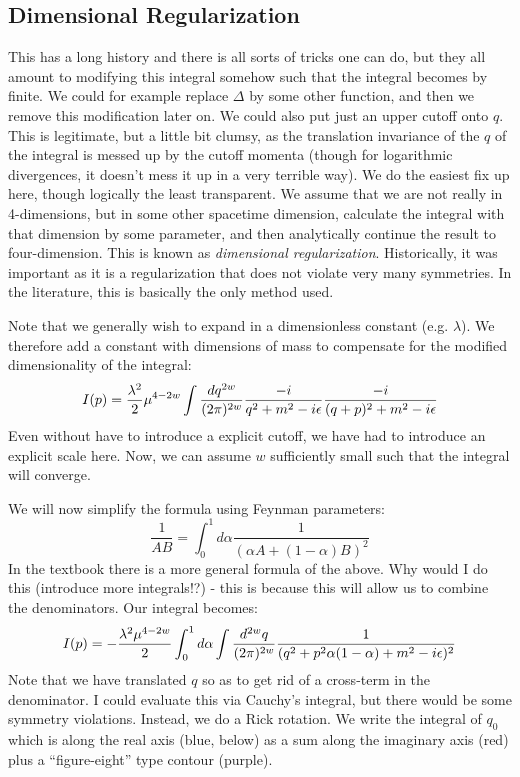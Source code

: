 \subsection{Dimensional Regularization}
This has a long history and there is all sorts of tricks one can do, but they all amount to modifying this integral somehow such that the integral becomes by finite. We could for example replace $\Delta$ by some other function, and then we remove this modification later on. We could also put just an upper cutoff onto $q$. This is legitimate, but a little bit clumsy, as the translation invariance of the $q$ of the integral is messed up by the cutoff momenta (though for logarithmic divergences, it doesn't mess it up in a very terrible way). We do the easiest fix up here, though logically the least transparent. We assume that we are not really in 4-dimensions, but in some other spacetime dimension, calculate the integral with that dimension by some parameter, and then analytically continue the result to four-dimension. This is known as \emph{dimensional regularization}. Historically, it was important as it is a regularization that does not violate very many symmetries. In the literature, this is basically the only method used. 

Note that we generally wish to expand in a dimensionless constant (e.g. $\lambda$). We therefore add a constant with dimensions of mass to compensate for the modified dimensionality of the integral:
\begin{equation}
    I(p) = \frac{\lambda^2}{2}\mu^{4 - 2w}\int \frac{dq^{2w}}{(2\pi)^{2w}} \frac{-i}{q^2 + m^2 - i\epsilon} \frac{-i}{(q+p)^2 + m^2 - i\epsilon}
\end{equation}
Even without have to introduce a explicit cutoff, we have had to introduce an explicit scale here. Now, we can assume $w$ sufficiently small such that the integral will converge.

We will now simplify the formula using Feynman parameters:
\begin{equation}
    \frac{1}{AB} = \int_0^1 d\alpha \frac{1}{(\alpha A + (1-\alpha)B)^2}
\end{equation}
In the textbook there is a more general formula of the above. Why would I do this (introduce more integrals!?) - this is because this will allow us to combine the denominators. Our integral becomes:
\begin{equation}
    I(p) = -\frac{\lambda^2\mu^{4-2w}}{2}\int_0^1 d\alpha \int \frac{d^{2w}q}{(2\pi)^{2w}} \frac{1}{(q^2 + p^2\alpha(1-\alpha) + m^2 - i\epsilon)^2}
\end{equation}
Note that we have translated $q$ so as to get rid of a cross-term in the denominator. I could evaluate this via Cauchy's integral, but there would be some symmetry violations. Instead, we do a Rick rotation. We write the integral of $q_0$ which is along the real axis (blue, below) as a sum along the imaginary axis (red) plus a ``figure-eight'' type contour (purple). 

